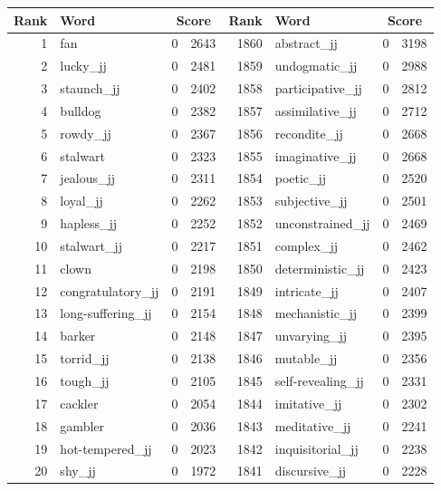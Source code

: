 \begin{table}[tbp]
    \begin{tabular}{| rlr@{.}l | rlr@{.}l |}
    \hline
    \textbf{Rank} & \textbf{Word} & \multicolumn{2}{c|}{\textbf{Score}} & \textbf{Rank} & \textbf{Word} & \multicolumn{2}{c|}{\textbf{Score}} \\
    \hline
    1 & fan & 0 & 2643    &    1860 & abstract\_jj & 0 & 3198 \\
    2 & lucky\_jj & 0 & 2481    &    1859 & undogmatic\_jj & 0 & 2988 \\
    3 & staunch\_jj & 0 & 2402    &    1858 & participative\_jj & 0 & 2812 \\
    4 & bulldog & 0 & 2382    &    1857 & assimilative\_jj & 0 & 2712 \\
    5 & rowdy\_jj & 0 & 2367    &    1856 & recondite\_jj & 0 & 2668 \\
    6 & stalwart & 0 & 2323    &    1855 & imaginative\_jj & 0 & 2668 \\
    7 & jealous\_jj & 0 & 2311    &    1854 & poetic\_jj & 0 & 2520 \\
    8 & loyal\_jj & 0 & 2262    &    1853 & subjective\_jj & 0 & 2501 \\
    9 & hapless\_jj & 0 & 2252    &    1852 & unconstrained\_jj & 0 & 2469 \\
    10 & stalwart\_jj & 0 & 2217    &    1851 & complex\_jj & 0 & 2462 \\
    11 & clown & 0 & 2198    &    1850 & deterministic\_jj & 0 & 2423 \\
    12 & congratulatory\_jj & 0 & 2191    &    1849 & intricate\_jj & 0 & 2407 \\
    13 & long-suffering\_jj & 0 & 2154    &    1848 & mechanistic\_jj & 0 & 2399 \\
    14 & barker & 0 & 2148    &    1847 & unvarying\_jj & 0 & 2395 \\
    15 & torrid\_jj & 0 & 2138    &    1846 & mutable\_jj & 0 & 2356 \\
    16 & tough\_jj & 0 & 2105    &    1845 & self-revealing\_jj & 0 & 2331 \\
    17 & cackler & 0 & 2054    &    1844 & imitative\_jj & 0 & 2302 \\
    18 & gambler & 0 & 2036    &    1843 & meditative\_jj & 0 & 2241 \\
    19 & hot-tempered\_jj & 0 & 2023    &    1842 & inquisitorial\_jj & 0 & 2238 \\
    20 & shy\_jj & 0 & 1972    &    1841 & discursive\_jj & 0 & 2228 \\

\end{tabular}
\end{table}
